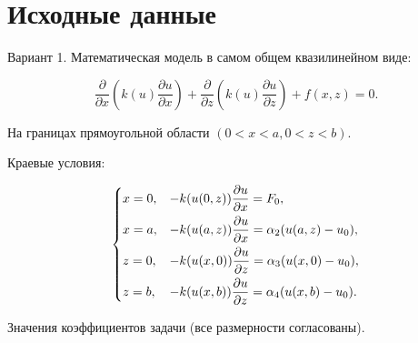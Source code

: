 \section{Исходные данные}

Вариант 1. Математическая модель в самом общем квазилинейном виде:

\begin{equation}
	\frac{\partial}{\partial x} \left( k(u) \frac{\partial u}{\partial x} \right) + \frac{\partial}{\partial z} \left( k(u) \frac{\partial u}{\partial z} \right) + f(x, z) = 0.
\end{equation}

На границах прямоугольной области $(0 < x < a, 0 < z < b)$.

\begin{center}
\end{center}

Краевые условия:

\begin{equation}
	\begin{dcases}
	x = 0, & -k(u(0, z)) \frac{\partial u}{\partial x} = F_0, \\
	x = a, & -k(u(a, z)) \frac{\partial u}{\partial x} = \alpha_2(u(a, z) - u_0), \\
	z = 0, & -k(u(x, 0)) \frac{\partial u}{\partial z} = \alpha_3(u(x, 0) - u_0), \\
	z = b, & -k(u(x, b)) \frac{\partial u}{\partial z} = \alpha_4(u(x, b) - u_0). \\
	\end{dcases}
\end{equation}

Значения коэффициентов задачи (все размерности согласованы).

